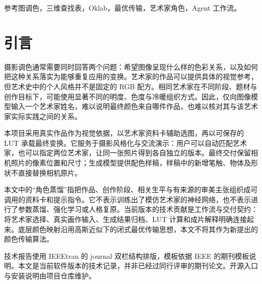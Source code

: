 \begin{abstract}
本文描述艺术家调色 Skill v1.0.0 的实现及其现有输出记录。系统接收一张照片和可选的风格诉求，从十位艺术家的资料卡与真实作品索引中选择参考，将照片与画作共同提交给图像编辑模型，再从模型的实际返回图估计全局颜色映射，导出 $65^3$ 三维查找表，并应用于原尺寸照片。艺术家第一人称解读在最终成片之后生成，用于解释可见的色彩关系，不参与本次图像生成。该设计将参考选择、生成式配色建议、确定性 LUT 渲染与角色解释分开归档，降低不同阶段被混用的可能。本文说明 Oklab 空间中的高斯最优传输拟合、文件身份检查、保存后重读渲染，以及面向豆包等宿主的能力分支。结果部分只汇总既有的十图十版与三图六版记录；后者的三张照片与前批重叠，不构成十六个独立样本。十六份记录均通过所保存 LUT 与导出 PNG 的采样回放核对，但这一检查不代表 LUT 与生成图逐像素一致，也不证明审美最佳或题材泛化能力。本次发布不增加独立试跑。
\end{abstract}

\begin{IEEEkeywords}
参考图调色，三维查找表，Oklab，最优传输，艺术家角色，Agent 工作流。
\end{IEEEkeywords}

\section{引言}
摄影调色通常需要同时回答两个问题：希望图像呈现什么样的色彩关系，以及如何把这种关系落实为能够重复应用的变换。艺术家的作品可以提供具体的视觉参考，但艺术史中的个人风格并不是固定的 RGB 配方。相同艺术家在不同阶段、题材与创作目标下，可能使用显著不同的明度、色度与冷暖组织方式。因此，仅向图像模型输入一个艺术家姓名，难以说明最终颜色来自哪件作品，也难以核对其与该艺术家实际实践之间的关系。

本项目采用真实作品作为视觉依据，以艺术家资料卡辅助选图，再以可保存的 LUT 承载最终变换。它服务于摄影风格化与交流演示：用户可以自动匹配艺术家，也可以指定两位艺术家，让同一张照片得到各自独立的版本。最终交付保留相机照片的像素位置和尺寸；生成模型提供配色样稿，样稿中的新增笔触、物体及形状不直接替换相机原片。

本文中的“角色蒸馏”指把作品、创作阶段、相关生平与有来源的审美主张组织成可调用的资料卡和提示指令。它不表示训练出了模仿艺术家的神经网络，也不表示进行了参数蒸馏、强化学习或人格复原。当前版本的技术贡献是工作流与交付契约：将艺术家选择、真实画作输入、生成结果归档、LUT 计算和成片解释明确连接起来。底层颜色映射沿用高斯近似下的闭式最优传输思想\cite{pitie}，本文不将其作为新提出的颜色传输算法。

技术报告使用 IEEEtran 的 journal 双栏结构排版，模板依据 IEEE 的期刊模板说明\cite{ieee}。本文是当前软件版本的技术记录，并非已经过同行评审的期刊论文。开源入口与安装说明由项目仓库维护\cite{repo}。


